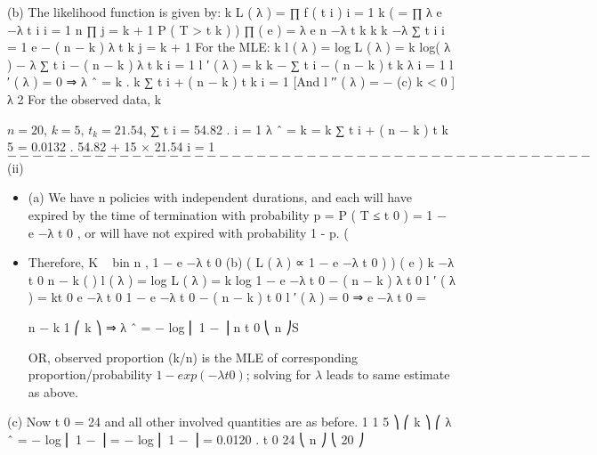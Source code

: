 \documentclass[a4paper,12pt]{article}
\begin{document}
(b)
The likelihood function is given by:
k
L ( λ ) = ∏ f ( t i )
i = 1
k
(
= ∏ λ e −λ t i
i = 1
n
∏
j = k + 1
P ( T > t k )
) ∏ ( e ) = λ e
n
−λ t k
k
k
−λ ∑ t i
i = 1
e − ( n − k ) λ t k
j = k + 1
For the MLE:
k
l ( λ ) = log L ( λ ) = k log( λ ) − λ ∑ t i − ( n − k ) λ t k
i = 1
l ′ ( λ ) =
k k
− ∑ t i − ( n − k ) t k
λ i = 1
l ′ ( λ ) = 0 ⇒ λ ˆ =
k
.
k
∑ t i + ( n − k ) t k
i = 1
[And l ′′ ( λ ) = −
(c)
k
< 0 ]
λ 2
For the observed data,
k

$n = 20$, $k = 5$, $t_k = 21.54$,
∑ t i = 54.82 .
i = 1
λ ˆ =
k
=
k
∑ t i + ( n − k ) t k
5
= 0.0132 .
54.82 + 15 × 21.54
i = 1
$-----------------------------------------------$
(ii)
\begin{itemize}
\item (a)
We have n policies with independent durations, and each will have expired by the time of termination with probability
p = P ( T ≤ t 0 ) = 1 − e −λ t 0 ,
or will have not expired with probability 1 - p.
(
\item Therefore, K ~ bin n , 1 − e −λ t 0
(b)
(
L ( λ ) ∝ 1 − e −λ t 0
)
) ( e )
k
−λ t 0 n − k
(
)
l ( λ ) = log L ( λ ) = k log 1 − e −λ t 0 − ( n − k ) λ t 0
l ′ ( λ ) =
kt 0 e −λ t 0
1 − e −λ t 0
− ( n − k ) t 0
l ′ ( λ ) = 0 ⇒ e −λ t 0 =

n − k
1
⎛ k ⎞
⇒ λ ˆ = − log ⎜ 1 − ⎟
n
t 0
⎝ n ⎠S

\item [OR, observed proportion (k/n) is the MLE of corresponding
proportion/probability ${1 − exp(−\lambda t 0 )}$; solving for $\lambda$  leads to same
estimate as above.]
\end{itemize}
(c)
Now t 0 = 24 and all other involved quantities are as before.
1
1
5 ⎞
⎛ k ⎞
⎛
λ ˆ = − log ⎜ 1 − ⎟ = − log ⎜ 1 − ⎟ = 0.0120 .
t 0
24
⎝ n ⎠
⎝ 20 ⎠
\end{document}
